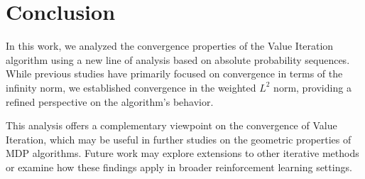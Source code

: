 \documentclass{article}
\begin{document}
\section{Conclusion}

In this work, we analyzed the convergence properties of the Value Iteration algorithm using a new line of analysis based on absolute probability sequences. While previous studies have primarily focused on convergence in terms of the infinity norm, we established convergence in the weighted $L^2$ norm, providing a refined perspective on the algorithm’s behavior. 

This analysis offers a complementary viewpoint on the convergence of Value Iteration, which may be useful in further studies on the geometric properties of MDP algorithms. Future work may explore extensions to other iterative methods or examine how these findings apply in broader reinforcement learning settings.



\end{document}
